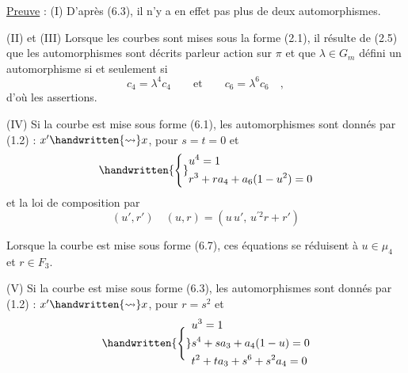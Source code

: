 
\uline{Preuve} : (I) D'après (6.3), il n'y a en effet pas plus de deux automorphismes.

(II) et (III) Lorsque les courbes sont mises sous la forme (2.1), il résulte de (2.5) que les automorphismes sont décrits parleur action sur $\pi$ et que $\lambda\in G_m$ défini un automorphisme si et seulement si
\[
c_4=\lambda^4c_4\qquad\text{et}\qquad c_6=\lambda^6c_6\quad,
\]
d'où les assertions.

(IV) Si la courbe est mise sous forme (6.1), les automorphismes sont donnés par (1.2) : $x'\handwritten{\rightsquigarrow}x$, pour $s=t=0$ et
\[
\handwritten{\Bigg\{}\begin{aligned}
&u^4=1\\
&r^3+ra_4+a_6(1-u^2)=0
\end{aligned}
\]
et la loi de composition par
\[
(u',r')\quad(u,r)=(u\,u',\,u^{\prime 2}r+r')
\]

Lorsque la courbe est mise sous forme (6.7), ces équations se réduisent à $u\in\mu_4$ et $r\in F_3$.

(V) Si la courbe est mise sous forme (6.3), les automorphismes sont donnés par (1.2) : $x'\handwritten{\rightsquigarrow}x$, pour $r=s^2$ et
\[
\handwritten{\Bigg\{}\begin{aligned}
&u^3=1\\
&s^4+sa_3+a_4(1-u)=0\\
&t^2+ta_3+s^6+s^2a_4=0
\end{aligned}
\]

